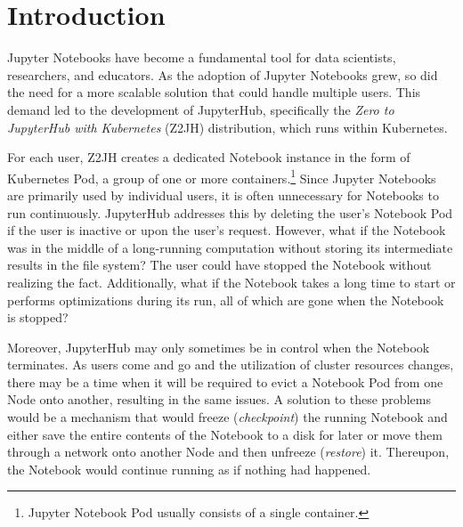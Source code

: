 \documentclass[
  digital,     %
  oneside,     %
  nosansbold,  %
  nocolorbold, %
  lof,         %
  nolot,         %
]{fithesis4}
\begin{document}
\chapter*{Introduction}

Jupyter Notebooks have become a fundamental tool for data scientists, researchers, and educators. As the adoption of Jupyter Notebooks grew, so did the need for a more scalable solution that could handle multiple users. This demand led to the development of JupyterHub, specifically the \emph{Zero to JupyterHub with Kubernetes} (Z2JH) distribution, which runs within Kubernetes.

For each user, Z2JH creates a dedicated Notebook instance in the form of Kubernetes Pod, a group of one or more containers.\footnote{Jupyter Notebook Pod usually consists of a single container.} Since Jupyter Notebooks are primarily used by individual users, it is often unnecessary for Notebooks to run continuously. JupyterHub addresses this by deleting the user's Notebook Pod if the user is inactive or upon the user's request. However, what if the Notebook was in the middle of a long-running computation without storing its intermediate results in the file system? The user could have stopped the Notebook without realizing the fact. Additionally, what if the Notebook takes a long time to start or performs optimizations during its run, all of which are gone when the Notebook is stopped?

Moreover, JupyterHub may only sometimes be in control when the Notebook terminates. As users come and go and the utilization of cluster resources changes, there may be a time when it will be required to evict a Notebook Pod from one Node onto another, resulting in the same issues. A solution to these problems would be a mechanism that would freeze (\emph{checkpoint}) the running Notebook and either save the entire contents of the Notebook to a disk for later or move them through a network onto another Node and then unfreeze (\emph{restore}) it. Thereupon, the Notebook would continue running as if nothing had happened.
\end{document}
